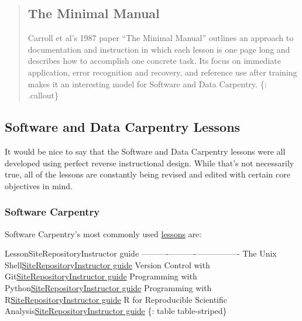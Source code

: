 \begin{quote}
\subsection{The Minimal Manual}\label{the-minimal-manual}

Carroll et al's 1987 paper
``The Minimal Manual'' \cite{bib:carroll-minimal-manual}
outlines an approach to documentation and instruction
in which each lesson is one page long and describes how to accomplish
one concrete task. Its focus on immediate application, error recognition
and recovery, and reference use after training makes it an interesting
model for Software and Data Carpentry. \{: .callout\}
\end{quote}

\subsection{Software and Data Carpentry
Lessons}\label{software-and-data-carpentry-lessons}

It would be nice to say that the Software and Data Carpentry lessons
were all developed using perfect reverse instructional design. While
that's not necessarily true, all of the lessons are constantly being
revised and edited with certain core objectives in mind.

\subsubsection{Software Carpentry}\label{software-carpentry}

Software Carpentry's most commonly used
\href{\{\{\%20site.swc\_site\%20\}\}/lessons/}{lessons} are:

\textbar{}Lesson\textbar{}Site\textbar{}Repository\textbar{}Instructor
guide\textbar{}
\textbar{}------\textbar{}----\textbar{}----------\textbar{}----------------\textbar{}
\textbar{}The Unix
Shell\textbar{}\href{\{\{site.swc\_pages\}\}/shell-novice/}{Site}\textbar{}\href{https://github.com/swcarpentry/shell-novice}{Repository}\textbar{}\href{\{\{site.swc\_pages\}\}/shell-novice/guide/}{Instructor
guide} \textbar{}Version Control with
Git\textbar{}\href{\{\{site.swc\_pages\}\}/git-novice/}{Site}\textbar{}\href{https://github.com/swcarpentry/git-novice}{Repository}\textbar{}\href{\{\{site.swc\_pages\}\}/git-novice/guide/}{Instructor
guide}\textbar{} \textbar{}Programming with
Python\textbar{}\href{\{\{site.swc\_pages\}\}/python-novice-inflammation/}{Site}\textbar{}\href{https://github.com/swcarpentry/python-novice-inflammation}{Repository}\textbar{}\href{\{\{site.swc\_pages\}\}/python-novice-inflammation/guide/}{Instructor
guide}\textbar{} \textbar{}Programming with
R\textbar{}\href{\{\{site.swc\_pages\}\}/r-novice-inflammation/}{Site}\textbar{}\href{https://github.com/swcarpentry/r-novice-inflammation}{Repository}\textbar{}\href{\{\{site.swc\_pages\}\}/r-novice-inflammation/guide/}{Instructor
guide}\textbar{} \textbar{}R for Reproducible Scientific
Analysis\textbar{}\href{\{\{site.swc\_pages\}\}/r-novice-gapminder/}{Site}\textbar{}\href{https://github.com/swcarpentry/r-novice-gapminder}{Repository}\textbar{}\href{\{\{site.swc\_pages\}\}/r-novice-gapminder/guide/}{Instructor
guide}\textbar{} \{: table table-striped\}

